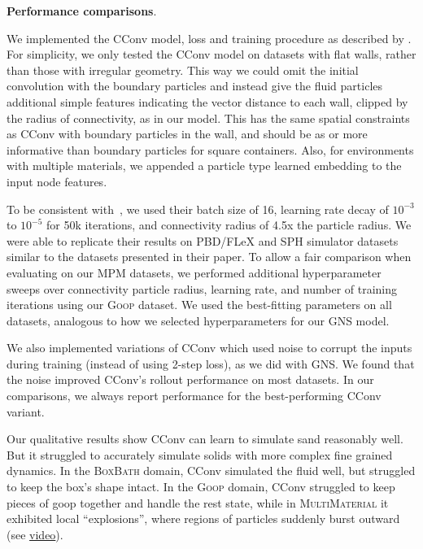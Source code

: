 \documentclass{article}
\newcommand{\xhdr}[1]{{\noindent\bfseries #1}.}
\newcommand\domain[1]{\textsc{#1}}
\newcommand\vidcconv[1]{\href{http://tny.sh/6I0girh}{#1}}
\begin{document}
%
%
%
%
%
%
%
%
%
%
%
%
%
%

\xhdr{Performance comparisons}
\nopagebreak

We implemented the CConv model, loss and training procedure as described by \citet{ummenhofer2020lagrangian}.
%
For simplicity, we only tested the CConv model on datasets with flat walls, rather than those with irregular geometry. This way we could omit the initial convolution with the boundary particles and instead give the fluid particles additional simple features indicating the vector distance to each wall, clipped by the radius of connectivity, as in our model. This has the same spatial constraints as CConv with boundary particles in the wall, and should be as or more informative than boundary particles for square containers. Also, for environments with multiple materials, we appended a particle type learned embedding to the input node features. 
%

To be consistent with~\citet{ummenhofer2020lagrangian}, we used their batch size of 16, learning rate decay of $10^{-3}$ to $10^{-5}$ for 50k iterations, and connectivity radius of 4.5x the particle radius. We were able to replicate their results on PBD/FLeX and SPH simulator datasets similar to the datasets presented in their paper.  
%
To allow a fair comparison when evaluating on our MPM datasets, we performed additional hyperparameter sweeps over connectivity particle radius, learning rate, and number of training iterations using our \domain{Goop} dataset. We used the best-fitting parameters on all datasets, analogous to how we selected hyperparameters for our GNS model.

We also implemented variations of CConv which used noise to corrupt the inputs during training (instead of using 2-step loss), as we did with GNS. We found that the noise improved CConv's rollout performance on most datasets. 
%
In our comparisons, we always report performance for the best-performing CConv variant.

%
%
%
%

Our qualitative results show CConv can learn to simulate sand reasonably well. But it struggled to accurately simulate solids with more complex fine grained dynamics. In the \domain{BoxBath} domain, CConv simulated the fluid well, but struggled to keep the box's shape intact. 
In the \domain{Goop} domain, CConv struggled to keep pieces of goop together and handle the rest state, while in \domain{MultiMaterial} it exhibited local ``explosions'', where regions of particles suddenly burst outward (see \vidcconv{video}). 
%
\end{document}
